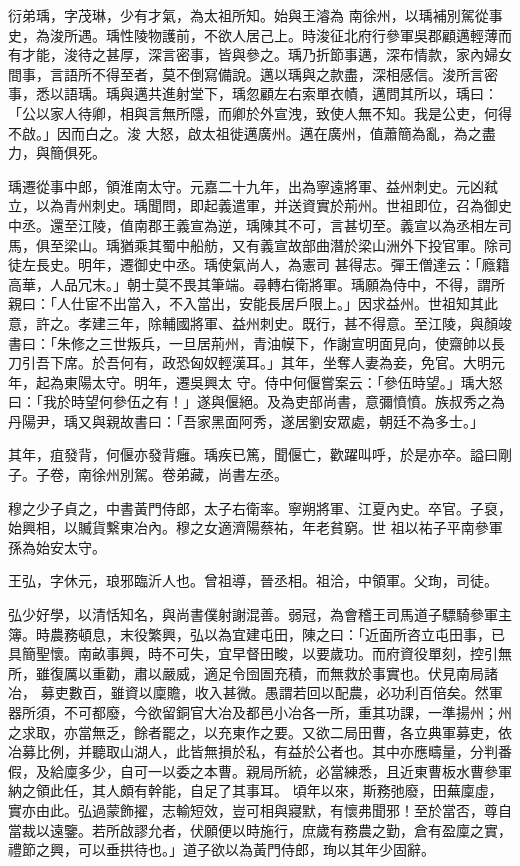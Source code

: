 \begin{pinyinscope}
 衍弟瑀，字茂琳，少有才氣，為太祖所知。始與王濬為
 南徐州，以瑀補別駕從事史，為浚所遇。瑀性陵物護前，不欲人居己上。時浚征北府行參軍吳郡顧邁輕薄而有才能，浚待之甚厚，深言密事，皆與參之。瑀乃折節事邁，深布情款，家內婦女間事，言語所不得至者，莫不倒寫備說。邁以瑀與之款盡，深相感信。浚所言密事，悉以語瑀。瑀與邁共進射堂下，瑀忽顧左右索單衣幘，邁問其所以，瑀曰：「公以家人待卿，相與言無所隱，而卿於外宣洩，致使人無不知。我是公吏，何得不啟。」因而白之。浚
 大怒，啟太祖徙邁廣州。邁在廣州，值蕭簡為亂，為之盡力，與簡俱死。



 瑀遷從事中郎，領淮南太守。元嘉二十九年，出為寧遠將軍、益州刺史。元凶弒立，以為青州刺史。瑀聞問，即起義遣軍，并送資實於荊州。世祖即位，召為御史中丞。還至江陵，值南郡王義宣為逆，瑀陳其不可，言甚切至。義宣以為丞相左司馬，俱至梁山。瑀猶乘其蜀中船舫，又有義宣故部曲潛於梁山洲外下投官軍。除司徒左長史。明年，遷御史中丞。瑀使氣尚人，為憲司
 甚得志。彈王僧達云：「廕籍高華，人品冗末。」朝士莫不畏其筆端。尋轉右衛將軍。瑀願為侍中，不得，謂所親曰：「人仕宦不出當入，不入當出，安能長居戶限上。」因求益州。世祖知其此意，許之。孝建三年，除輔國將軍、益州刺史。既行，甚不得意。至江陵，與顏竣書曰：「朱修之三世叛兵，一旦居荊州，青油幙下，作謝宣明面見向，使齋帥以長刀引吾下席。於吾何有，政恐匈奴輕漢耳。」其年，坐奪人妻為妾，免官。大明元年，起為東陽太守。明年，遷吳興太
 守。侍中何偃嘗案云：「參伍時望。」瑀大怒曰：「我於時望何參伍之有！」遂與偃絕。及為吏部尚書，意彌憤憤。族叔秀之為丹陽尹，瑀又與親故書曰：「吾家黑面阿秀，遂居劉安眾處，朝廷不為多士。」



 其年，疽發背，何偃亦發背癰。瑀疾已篤，聞偃亡，歡躍叫呼，於是亦卒。謚曰剛子。子卷，南徐州別駕。卷弟藏，尚書左丞。



 穆之少子貞之，中書黃門侍郎，太子右衛率。寧朔將軍、江夏內史。卒官。子裒，始興相，以贓貨繫東冶內。穆之女適濟陽蔡祐，年老貧窮。世
 祖以祐子平南參軍孫為始安太守。



 王弘，字休元，琅邪臨沂人也。曾祖導，晉丞相。祖洽，中領軍。父珣，司徒。



 弘少好學，以清恬知名，與尚書僕射謝混善。弱冠，為會稽王司馬道子驃騎參軍主簿。時農務頓息，末役繁興，弘以為宜建屯田，陳之曰：「近面所咨立屯田事，已具簡聖懷。南畝事興，時不可失，宜早督田畯，以要歲功。而府資役單刻，控引無所，雖復厲以重勸，肅以嚴威，適足令囹圄充積，而無救於事實也。伏見南局諸冶，
 募吏數百，雖資以廩贍，收入甚微。愚謂若回以配農，必功利百倍矣。然軍器所須，不可都廢，今欲留銅官大冶及都邑小冶各一所，重其功課，一準揚州；州之求取，亦當無乏，餘者罷之，以充東作之要。又欲二局田曹，各立典軍募吏，依冶募比例，并聽取山湖人，此皆無損於私，有益於公者也。其中亦應疇量，分判番假，及給廩多少，自可一以委之本曹。親局所統，必當練悉，且近東曹板水曹參軍納之領此任，其人頗有幹能，自足了其事耳。
 頃年以來，斯務弛廢，田蕪廩虛，實亦由此。弘過蒙飾擢，志輸短效，豈可相與寢默，有懷弗聞邪！至於當否，尊自當裁以遠鑒。若所啟謬允者，伏願便以時施行，庶歲有務農之勤，倉有盈廩之實，禮節之興，可以垂拱待也。」道子欲以為黃門侍郎，珣以其年少固辭。




\end{pinyinscope}
